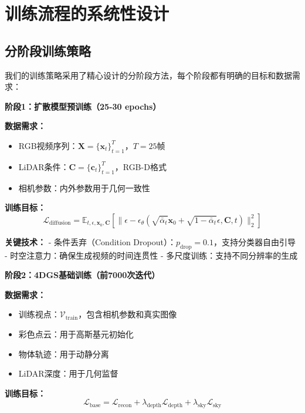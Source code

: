 \section{训练流程的系统性设计}

\subsection{分阶段训练策略}

我们的训练策略采用了精心设计的分阶段方法，每个阶段都有明确的目标和数据需求：

\textbf{阶段1：扩散模型预训练（25-30 epochs）}

\textbf{数据需求：}
\begin{itemize}
\item RGB视频序列：$\mathbf{X} = \{\mathbf{x}_t\}_{t=1}^{T}$，$T=25$帧
\item LiDAR条件：$\mathbf{C} = \{\mathbf{c}_t\}_{t=1}^{T}$，RGB-D格式
\item 相机参数：内外参数用于几何一致性
\end{itemize}

\textbf{训练目标：}
\begin{equation}
\mathcal{L}_{\text{diffusion}} = \mathbb{E}_{t,\epsilon,\mathbf{x}_0,\mathbf{C}} \left[ \|\epsilon - \epsilon_\theta(\sqrt{\bar{\alpha}_t} \mathbf{x}_0 + \sqrt{1-\bar{\alpha}_t} \epsilon, \mathbf{C}, t)\|_2^2 \right]
\label{eq:diffusion_pretraining}
\end{equation}

\textbf{关键技术：}
- 条件丢弃（Condition Dropout）：$p_{\text{drop}} = 0.1$，支持分类器自由引导
- 时空注意力：确保生成视频的时间连贯性
- 多尺度训练：支持不同分辨率的生成

\textbf{阶段2：4DGS基础训练（前7000次迭代）}

\textbf{数据需求：}
\begin{itemize}
\item 训练视点：$\mathcal{V}_{\text{train}}$，包含相机参数和真实图像
\item 彩色点云：用于高斯基元初始化
\item 物体轨迹：用于动静分离
\item LiDAR深度：用于几何监督
\end{itemize}

\textbf{训练目标：}
\begin{equation}
\mathcal{L}_{\text{base}} = \mathcal{L}_{\text{recon}} + \lambda_{\text{depth}} \mathcal{L}_{\text{depth}} + \lambda_{\text{sky}} \mathcal{L}_{\text{sky}}
\label{eq:base_training}
\end{equation}

